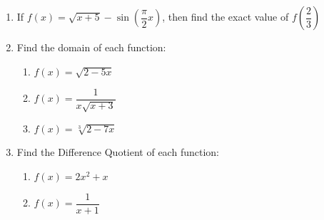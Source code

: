 \documentclass[12pt]{article}
\begin{document}
 
\begin{enumerate}
\item If $f(x) = \sqrt{x+5}-\sin\left( \dfrac{\pi}{2}x\right)$, then find the exact value of $f\left(\dfrac{2}{3}\right)$

\vfill

\item Find the domain of each function:
\begin{enumerate}
    \item $f(x) = \sqrt{2-5x}$
    \vfill
    \item $f(x) = \dfrac{1}{x\sqrt{x+3}}$
    \vfill
    \item $f(x) = \sqrt[3]{2-7x}$
    \vfill
\end{enumerate}

\pagebreak

\item Find the Difference Quotient of each function:
\begin{enumerate}
    \item $f(x) = 2x^2+x$
    \pagebreak
    
    \item $f(x) = \dfrac{1}{x+1}$
    \vfill
\end{enumerate}
\end{enumerate}
\end{document}
